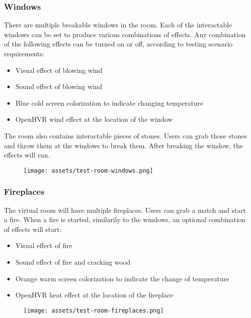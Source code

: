 \hypertarget{x-windows}{\subsubsection*{Windows}}
There are multiple breakable windows in the room. Each of the interactable
windows can be set to produce various combinations of effects. Any combination
of the following effects can be turned on or off, according to testing
scenario requirements:


\begin{itemize}

\item Visual effect of blowing wind

\item Sound effect of blowing wind

\item Blue cold screen colorization to indicate changing temperature

\item OpenHVR wind effect at the location of the window

\end{itemize}


The room also contains interactable pieces of stones. Users can grab those
stones and throw them at the windows to break them. After breaking the window,
the effects will run.


\begin{figure}[h]{}
\centering\texttt{[image: assets/test-room-windows.png]}
\caption{}

\end{figure}

\hypertarget{x-fireplaces}{\subsubsection*{Fireplaces}}
The virtual room will have multiple fireplaces. Users can grab a match and
start a fire. When a fire is started, similarily to the windows, an optional
combination of effects will start:


\begin{itemize}

\item Visual effect of fire

\item Sound effect of fire and cracking wood

\item Orange warm screen colorization to indicate the change of temperature

\item OpenHVR heat effect at the location of the fireplace

\end{itemize}


\begin{figure}[h]{}
\centering\texttt{[image: assets/test-room-fireplaces.png]}
\caption{}

\end{figure}